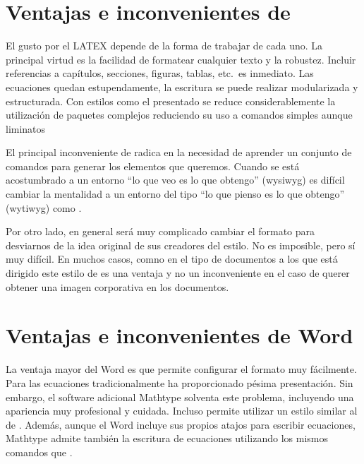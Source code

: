 \section{Ventajas e inconvenientes de \LaTeXe}

El gusto por el LATEX depende de la forma de trabajar de cada uno. La principal virtud
es la facilidad de formatear cualquier texto y la robustez. Incluir referencias a capítulos, secciones, figuras, tablas, etc.\ es
inmediato. Las ecuaciones quedan estupendamente, la escritura se puede realizar modularizada y estructurada. Con estilos como el presentado se reduce considerablemente la utilización de paquetes complejos reduciendo su uso a comandos simples aunque liminatos


El principal inconveniente de \LaTeXe radica en la necesidad de aprender un conjunto de
comandos para generar los elementos que queremos. Cuando se está acostumbrado a un
entorno ``lo que veo es lo que obtengo'' (\acs{wysiwyg}) es difícil cambiar la mentalidad a un entorno del tipo ``lo que pienso es lo que obtengo'' (\acs{wytiwyg}) como \LaTeXe.

Por otro lado, en general será muy complicado cambiar el formato para desviarnos de
la idea original de sus creadores del estilo. No es imposible, pero sí muy difícil. En muchos casos, comno en el tipo de documentos a los que está dirigido este estilo de \LaTeXe es una ventaja y no un inconveniente en el caso de querer obtener una imagen corporativa en los documentos.

\section{Ventajas e inconvenientes de Word\textsuperscript{\textregistered}}

La ventaja mayor del Word\textsuperscript{\textregistered} es que permite configurar el formato muy fácilmente. Para
las ecuaciones tradicionalmente ha proporcionado pésima presentación. Sin embargo, el software adicional
Mathtype\textsuperscript{\textregistered} solventa este problema, incluyendo una apariencia muy profesional y
cuidada. Incluso permite utilizar un estilo similar al de \LaTeXe. Además, aunque el Word\textsuperscript{\textregistered}
incluye sus propios atajos para escribir ecuaciones, Mathtype\textsuperscript{\textregistered} admite también la escritura de ecuaciones utilizando los mismos comandos que \LaTeXe.

